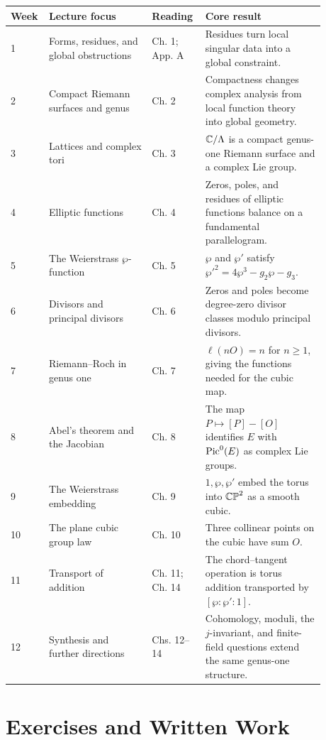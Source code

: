 \begin{center}
\footnotesize
\renewcommand{\arraystretch}{1.16}
\begin{tabular}{@{}L{0.06\linewidth}L{0.31\linewidth}L{0.15\linewidth}L{0.36\linewidth}@{}}
\textbf{Week} & \textbf{Lecture focus} & \textbf{Reading} & \textbf{Core result}\\
 &
Forms, residues, and global obstructions &
Ch. 1; App. A &
Residues turn local singular data into a global constraint.\\
2 &
Compact Riemann surfaces and genus &
Ch. 2 &
Compactness changes complex analysis from local function theory into global
geometry.\\
3 &
Lattices and complex tori &
Ch. 3 &
\(\mathbb{C}/\Lambda\) is a compact genus-one Riemann surface and a complex Lie group.\\
4 &
Elliptic functions &
Ch. 4 &
Zeros, poles, and residues of elliptic functions balance on a fundamental
parallelogram.\\
5 &
The Weierstrass \(\wp\)-function &
Ch. 5 &
\(\wp\) and \(\wp'\) satisfy
\(\wp'^2=4\wp^3-g_2\wp-g_3\).\\
6 &
Divisors and principal divisors &
Ch. 6 &
Zeros and poles become degree-zero divisor classes modulo principal divisors.\\
7 &
Riemann--Roch in genus one &
Ch. 7 &
\(\ell(nO)=n\) for \(n\geq 1\), giving the functions needed for the cubic map.\\
8 &
Abel's theorem and the Jacobian &
Ch. 8 &
The map \(P\mapsto[P]-[O]\) identifies \(E\) with \(\operatorname{Pic}^0(E)\) as complex Lie
groups.\\
9 &
The Weierstrass embedding &
Ch. 9 &
\(1,\wp,\wp'\) embed the torus into \(\mathbb{CP}^2\) as a smooth cubic.\\
10 &
The plane cubic group law &
Ch. 10 &
Three collinear points on the cubic have sum \(O\).\\
11 &
Transport of addition &
Ch. 11; Ch. 14 &
The chord--tangent operation is torus addition transported by
\([\wp:\wp':1]\).\\
12 &
Synthesis and further directions &
Chs. 12--14 &
Cohomology, moduli, the \(j\)-invariant, and finite-field questions extend the
same genus-one structure.
\end{tabular}
\end{center}

\section*{Exercises and Written Work}

